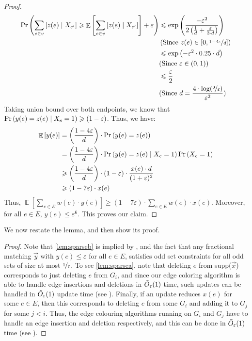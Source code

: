 \documentclass[a4paper,11pt]{article}
\DeclareMathOperator*{\Exp}{\ensuremath{{\mathbb{E}}}}
\DeclareMathOperator*{\Prob}{\ensuremath{\textnormal{Pr}}}
\renewcommand{\Pr}{\Prob}
\newcommand{\prob}[1]{\Pr\paren{#1}}
\newcommand{\paren}[1]{\left ( #1 \right )}
\newcommand{\bracket}[1]{\left [ #1 \right ]}
\newcommand{\expect}[1]{\Exp\bracket{#1}}
\newcommand{\eps}{\varepsilon}
\theoremstyle{definition}
\theoremstyle{definition}
\theoremstyle{definition}
\theoremstyle{definition}
\theoremstyle{definition}
\theoremstyle{definition}
\theoremstyle{definition}
\theoremstyle{definition}
\theoremstyle{definition}
\theoremstyle{definition}
\theoremstyle{definition}
\theoremstyle{definition}
\theoremstyle{definition}
\theoremstyle{definition}
\theoremstyle{definition}
\begin{document}
\begin{proof}
\begin{align*}
\prob{\sum_{e\in v}\bracket{z(e)\mid X_{e'}}\geqslant \expect{\sum_{e\in v}\bracket{z(e)\mid X_{e'}}}+\eps}&\leqslant \exp\paren{\frac{-\eps^2}{2\paren{\frac{1}{d}+\frac{\eps}{3\cdot d}}}}\\
&\paren{\text{Since }z(e)\in \bracket{0,\nicefrac{1-4\eps}{d}}}\\
&\leqslant \exp\paren{-\eps^2\cdot 0.25\cdot d}\\
&\text{(Since }\eps\in (0,1))\\
&\leqslant \frac{\eps}{2}\\
&\text{(Since }d=\frac{4\cdot \log(\nicefrac{2}{\eps})}{\eps^2})
\end{align*}
Taking union bound over both endpoints, we know that $\prob{y(e)=z(e)\mid X_e=1}\geqslant (1-\eps)$. Thus, we have:
\begin{align*}
\expect{y(e)}&=\paren{\frac{1-4\eps}{d}}\cdot \prob{y(e)=z(e)}\\
					&=\paren{\frac{1-4\eps}{d}}\cdot \prob{y(e)=z(e)\mid X_e=1}\prob{X_e=1}\\
					&\geqslant \paren{\frac{1-4\eps}{d}}\cdot (1-\eps)\cdot \frac{x(e)\cdot d}{(1+\eps)^2}\\
					&\geqslant (1-7\eps)\cdot x(e)
\end{align*}
Thus, $\expect{\sum_{e\in E}w(e)\cdot y(e)}\geqslant (1-7\eps)\cdot \sum_{e\in E}w(e)\cdot x(e)$. Moreover, for all $e\in E$, $y(e)\leqslant \eps^6$. This proves our claim. 
\end{proof}

We now restate the lemma, and then show its proof. 

\lemuno*
\begin{proof}
Note that \ref{lem:sparseb} is implied by , and the fact that any fractional matching $\vec{y}$ with $y(e)\leqslant \eps$ for all $e\in E$, satisfies odd set constraints for all odd sets of size at most $\nicefrac{1}{\eps}$. To see \ref{lem:sparsea}, note that deleting $e$ from supp($\vec{x}$) corresponds to just deleting $e$ from $G_i$, and since our edge coloring algorithm is able to handle edge insertions and deletions in $\Tilde{O}_{\eps}(1)$ time, such updates can be handled in $\Tilde{O}_{\eps}(1)$ update time (see ). Finally, if an update reduces $x(e)$ for some $e\in E$, then this corresponds to deleting $e$ from some $G_i$ and adding it to $G_j$ for some $j<i$. Thus, the edge colouring algorithms running on $G_i$ and $G_j$ have to handle an edge insertion and deletion respectively, and this can be done in $\Tilde{O}_{\eps}(1)$ time (see ). 
\end{proof}
\end{document}

